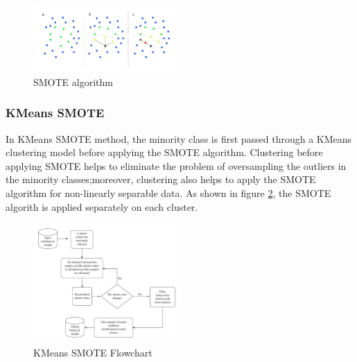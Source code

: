 \documentclass[twoside,11pt,a4paper]{article}
\begin{document}
\begin{figure}[ht]
	\centering
	\includegraphics[width=0.5\textwidth]{smote}
	\caption[\acs{SMOTE} algorithm]{\acs{SMOTE} algorithm \citep{schubachimbalance}}
	\label{fig:smote}
\end{figure}
\subsubsection{KMeans \acs{SMOTE}}
In KMeans \acs{SMOTE} method, the minority class is first passed through a KMeans clustering model before applying the \acs{SMOTE} algorithm. Clustering before applying \acs{SMOTE} helps to eliminate the problem of oversampling the outliers in the minority classes;moreover, clustering also helps to apply the \acs{SMOTE} algorithm for non-linearly separable data. As shown in  figure \ref{fig:kmeans_smote}, the SMOTE algorith is applied separately on each cluster.
\begin{figure}[ht]
	\centering
	\includegraphics[width=0.5\textwidth]{kmeans_smote}
	\caption[KMeans \acs{SMOTE} algorithm]{KMeans \acs{SMOTE} Flowchart \citep{chen2021research}}
	\label{fig:kmeans_smote}
\end{figure}
\end{document}
